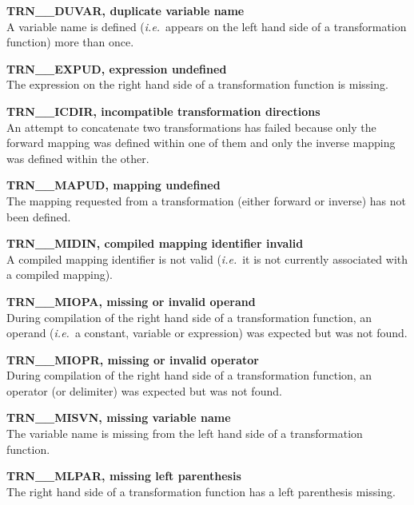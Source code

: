 \documentclass[twoside,nolof,11pt]{starlink}
\begin{document}
\begin{description}
\item \textbf{TRN\_\_DUVAR, duplicate variable name}\\
A variable name is defined (\emph{i.e.}\ appears on the left hand side of a
transformation function) more than once.

\item \textbf{TRN\_\_EXPUD, expression undefined}\\
The expression on the right hand side of a transformation function is
missing.

\item \textbf{TRN\_\_ICDIR, incompatible transformation directions}\\
An attempt to concatenate two transformations has failed because only the
forward mapping was defined within one of them and only the inverse mapping
was defined within the other.

\item \textbf{TRN\_\_MAPUD, mapping undefined}\\
The mapping requested from a transformation (either forward or inverse) has
not been defined.

\item \textbf{TRN\_\_MIDIN, compiled mapping identifier invalid}\\
A compiled mapping identifier is not valid (\emph{i.e.}\ it is not currently
associated with a compiled mapping).

\item \textbf{TRN\_\_MIOPA, missing or invalid operand}\\
During compilation of the right hand side of a transformation function, an
operand (\emph{i.e.}\ a constant, variable or expression) was expected but was
not found.

\item \textbf{TRN\_\_MIOPR, missing or invalid operator}\\
During compilation of the right hand side of a transformation function, an
operator (or delimiter) was expected but was not found.

\item \textbf{TRN\_\_MISVN, missing variable name}\\
The variable name is missing from the left hand side of a transformation
function.

\item \textbf{TRN\_\_MLPAR, missing left parenthesis}\\
The right hand side of a transformation function has a left parenthesis
missing.


\end{description}
\end{document}
